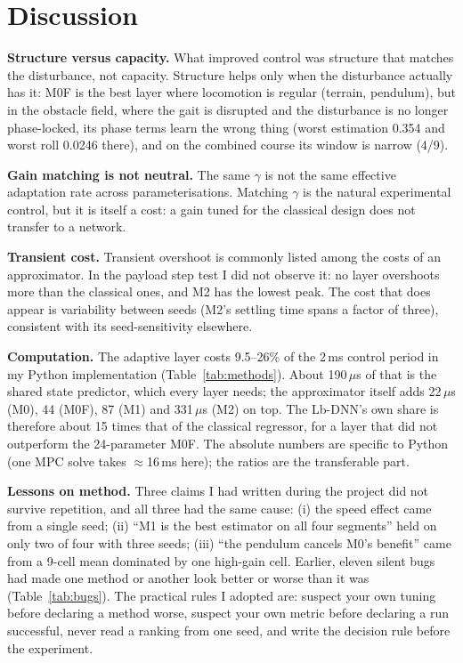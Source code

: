 \documentclass[conference]{IEEEtran}
\begin{document}
\section{Discussion}\label{sec:discussion}

\textbf{Structure versus capacity.} What improved control was structure
that matches the disturbance, not capacity. Structure helps only when
the disturbance actually has it: M0F is the best layer where locomotion
is regular (terrain, pendulum), but in the obstacle field, where the
gait is disrupted and the disturbance is no longer phase-locked, its
phase terms learn the wrong thing (worst estimation 0.354 and worst roll
0.0246 there), and on the combined course its window is narrow (4/9).

\textbf{Gain matching is not neutral.} The same $\gamma$ is not the same
effective adaptation rate across parameterisations. Matching $\gamma$ is
the natural experimental control, but it is itself a cost: a gain tuned
for the classical design does not transfer to a network.

\textbf{Transient cost.} Transient overshoot is commonly listed among
the costs of an approximator. In the payload step test I did not observe
it: no layer overshoots more than the classical ones, and M2 has the
lowest peak. The cost that does appear is variability between seeds
(M2's settling time spans a factor of three), consistent with its
seed-sensitivity elsewhere.

\textbf{Computation.} The adaptive layer costs 9.5--26\% of the 2\,ms
control period in my Python implementation (Table~\ref{tab:methods}).
About 190\,$\mu$s of that is the shared state predictor, which every
layer needs; the approximator itself adds 22\,$\mu$s (M0), 44 (M0F), 87
(M1) and 331\,$\mu$s (M2) on top. The Lb-DNN's own share is therefore
about 15 times that of the classical regressor, for a layer that did not
outperform the 24-parameter M0F. The absolute numbers are specific to
Python (one MPC solve takes $\approx$16\,ms here); the ratios are the
transferable part.

\textbf{Lessons on method.} Three claims I had written during the
project did not survive repetition, and all three had the same cause:
(i) the speed effect came from a single seed; (ii) ``M1 is the best
estimator on all four segments'' held on only two of four with three
seeds; (iii) ``the pendulum cancels M0's benefit'' came from a 9-cell
mean dominated by one high-gain cell. Earlier, eleven silent bugs had
made one method or another look better or worse than it was
(Table~\ref{tab:bugs}). The practical rules I adopted are: suspect your own tuning before declaring a method
worse, suspect your own metric before declaring a run successful, never
read a ranking from one seed, and write the decision rule before the
experiment.
\end{document}
